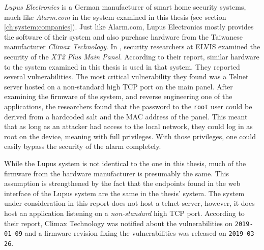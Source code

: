 \textit{Lupus Electronics} is a German manufacturer of smart home security systems, much like \textit{Alarm.com} in the system examined in this thesis (see section \ref{ch:system:companies}). Just like Alarm.com, Lupus Electronics mostly provides the software of their system and also purchase hardware from the Taiwanese manufacturer \textit{Climax Technology}. In \citeyear{labvienna}, security researchers at ELVIS examined the security of the \textit{XT2 Plus Main Panel}. According to their report, similar hardware to the system examined in this thesis is used in that system. They reported several vulnerabilities. The most critical vulnerability they found was a Telnet server hosted on a non-standard high TCP port on the main panel. After examining the firmware of the system, and reverse engineering one of the applications, the researchers found that the password to the \texttt{root} user could be derived from a hardcoded salt and the MAC address of the panel. This meant that as long as an attacker had access to the local network, they could log in as root on the device, meaning with full privileges. With those privileges, one could easily bypass the security of the alarm completely.

While the Lupus system is not identical to the one in this thesis, much of the firmware from the hardware manufacturer is presumably the same. This assumption is strengthened by the fact that the endpoints found in the web interface of the Lupus system are the same in the thesis' system. The system under consideration in this report does not host a telnet server, however, it does host an application listening on a \textit{non-standard} high TCP port. According to their report, Climax Technology was notified about the vulnerabilities on \texttt{2019-01-09} and a firmware revision fixing the vulnerabilities was released on \texttt{2019-03-26}.

